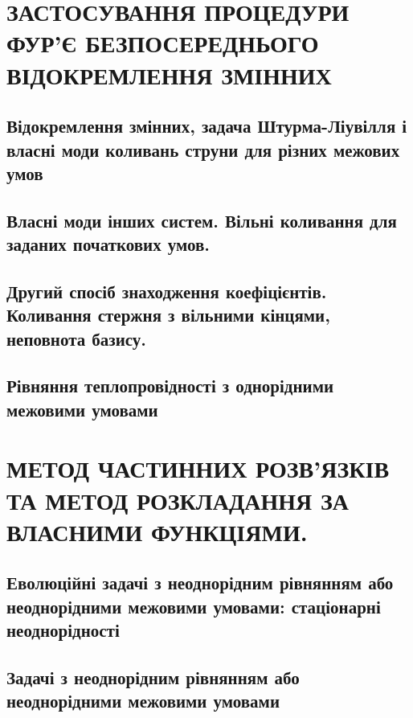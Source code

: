 \documentclass[a4paper, 14pt]{extreport}
\begin{document}
\tableofcontents
\setcounter{page}{2}

\part{ЗАСТОСУВАННЯ ПРОЦЕДУРИ ФУР’Є БЕЗПОСЕРЕДНЬОГО ВІДОКРЕМЛЕННЯ ЗМІННИХ}

\chapter{Відокремлення змінних, задача Штурма-Ліувілля і власні моди коливань струни для різних межових умов}


\chapter{Власні моди інших систем. Вільні коливання для заданих початкових умов.}

\vspace{2cm}


\chapter{Другий спосіб знаходження коефіцієнтів. Коливання стержня з вільними кінцями, неповнота базису.}



\chapter{Рівняння теплопровідності з однорідними межовими умовами}

\vspace{2cm}



\part{МЕТОД ЧАСТИННИХ РОЗВ’ЯЗКІВ ТА МЕТОД РОЗКЛАДАННЯ ЗА ВЛАСНИМИ ФУНКЦІЯМИ.}

\chapter{Еволюційні задачі з неоднорідним рівнянням або неоднорідними межовими умовами: стаціонарні неоднорідності}



\chapter{Задачі з неоднорідним рівнянням або неоднорідними межовими умовами}

\vspace{2cm}

\end{document}
